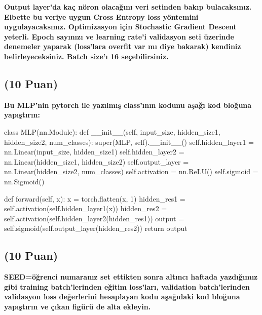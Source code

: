 \documentclass[11pt]{article}
\begin{document}
\textbf{Output layer'da kaç nöron olacağını veri setinden bakıp bulacaksınız. Elbette bu veriye uygun Cross Entropy loss yöntemini uygulayacaksınız. Optimizasyon için Stochastic Gradient Descent yeterli. Epoch sayınızı ve learning rate'i validasyon seti üzerinde denemeler yaparak (loss'lara overfit var mı diye bakarak) kendiniz belirleyeceksiniz. Batch size'ı 16 seçebilirsiniz.}

\subsection{(10 Puan)} \textbf{Bu MLP'nin pytorch ile yazılmış class'ının kodunu aşağı kod bloğuna yapıştırın:}

\begin{python}
class MLP(nn.Module):
    def __init__(self, input_size, hidden_size1, hidden_size2, num_classes):
        super(MLP, self).__init__()
        self.hidden_layer1 = nn.Linear(input_size, hidden_size1)
        self.hidden_layer2 = nn.Linear(hidden_size1, hidden_size2)
        self.output_layer = nn.Linear(hidden_size2, num_classes)
        self.activation = nn.ReLU()
        self.sigmoid = nn.Sigmoid()

    def forward(self, x):
        x = torch.flatten(x, 1)
        hidden_res1 = self.activation(self.hidden_layer1(x))
        hidden_res2 = self.activation(self.hidden_layer2(hidden_res1))
        output = self.sigmoid(self.output_layer(hidden_res2))
        return output
\end{python}

\subsection{(10 Puan)} \textbf{SEED=öğrenci numaranız set ettikten sonra altıncı haftada yazdığımız gibi training batch'lerinden eğitim loss'ları, validation batch'lerinden validasyon loss değerlerini hesaplayan kodu aşağıdaki kod bloğuna yapıştırın ve çıkan figürü de alta ekleyin.}
\end{document}
